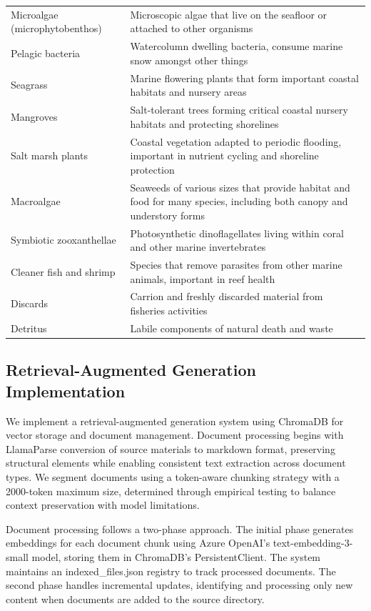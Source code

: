 \begin{longtable}{p{}p{}}
  Microalgae (microphytobenthos) & Microscopic algae that live on the seafloor or attached to other organisms \\
  Pelagic bacteria & Watercolumn dwelling bacteria, consume marine snow amongst other things \\
  Seagrass & Marine flowering plants that form important coastal habitats and nursery areas \\
  Mangroves & Salt-tolerant trees forming critical coastal nursery habitats and protecting shorelines \\
  Salt marsh plants & Coastal vegetation adapted to periodic flooding, important in nutrient cycling and shoreline protection \\
  Macroalgae & Seaweeds of various sizes that provide habitat and food for many species, including both canopy and understory forms \\
  Symbiotic zooxanthellae & Photosynthetic dinoflagellates living within coral and other marine invertebrates \\
  Cleaner fish and shrimp & Species that remove parasites from other marine animals, important in reef health \\
  Discards & Carrion and freshly discarded material from fisheries activities \\
  Detritus & Labile components of natural death and waste \\
  \end{longtable}
  
  \subsection{Retrieval-Augmented Generation Implementation}\label{supp:rag_implementation}
  
  We implement a retrieval-augmented generation system using ChromaDB for vector storage and document management. Document processing begins with LlamaParse conversion of source materials to markdown format, preserving structural elements while enabling consistent text extraction across document types. We segment documents using a token-aware chunking strategy with a 2000-token maximum size, determined through empirical testing to balance context preservation with model limitations.
  
  Document processing follows a two-phase approach. The initial phase generates embeddings for each document chunk using Azure OpenAI's text-embedding-3-small model, storing them in ChromaDB's PersistentClient. The system maintains an indexed\_files.json registry to track processed documents. The second phase handles incremental updates, identifying and processing only new content when documents are added to the source directory.
  
